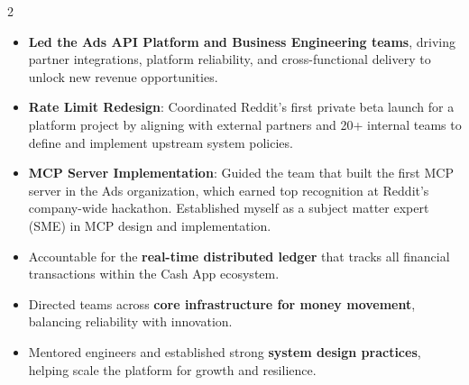 \documentclass[10pt,a4paper,ragged2e,withhyper]{altacv}
\begin{document}
\begin{paracol}{2}

\divider{}


\begin{itemize}
    \item \textbf{Led the Ads API Platform and Business Engineering teams}, driving partner integrations, platform reliability, and cross-functional delivery to unlock new revenue opportunities. 
    \item \textbf{Rate Limit Redesign}: Coordinated Reddit’s first private beta launch for a platform project by aligning with external partners and 20+ internal teams to define and implement upstream system policies.
    \item \textbf{MCP Server Implementation}: Guided the team that built the first MCP server in the Ads organization, which earned top recognition at Reddit’s company-wide hackathon. Established myself as a subject matter expert (SME) in MCP design and implementation.
\end{itemize}


\divider{}

\newpage

\begin{itemize}
    \item Accountable for the \textbf{real-time distributed ledger} that tracks all financial transactions within the Cash App ecosystem.
    \item Directed teams across \textbf{core infrastructure for money movement}, balancing reliability with innovation.
    \item Mentored engineers and established strong \textbf{system design practices}, helping scale the platform for growth and resilience.
\end{itemize}


\divider{}



\end{paracol}
\end{document}
